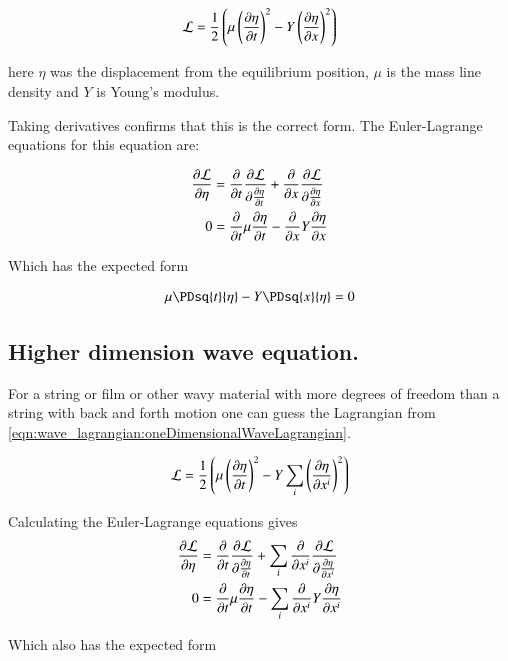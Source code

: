 \begin{align}\label{eqn:wave_lagrangian:oneDimensionalWaveLagrangian}
\mathcal{L} = \frac{1}{2} \left(\mu \left(\frac{\partial {\eta}}{\partial {t}}\right)^2 - Y \left(\frac{\partial {\eta}}{\partial {x}}\right)^2 \right)
\end{align}

here $\eta$ was the displacement from the equilibrium position, $\mu$ is the mass line density and $Y$ is Young's modulus.

Taking derivatives confirms that this is the correct form.  The Euler-Lagrange
equations for this equation are:

\begin{align*}
\frac{\partial {\mathcal{L}}}{\partial {\eta}} &= \frac{\partial {}}{\partial {t}} \frac{\partial {\mathcal{L}}}{\partial {\frac{\partial {\eta}}{\partial {t}}}} +\frac{\partial {}}{\partial {x}} \frac{\partial {\mathcal{L}}}{\partial {\frac{\partial {\eta}}{\partial {x}}}} \\
0 &= \frac{\partial {}}{\partial {t}} \mu \frac{\partial {\eta}}{\partial {t}} -\frac{\partial {}}{\partial {x}} Y \frac{\partial {\eta}}{\partial {x}} \\
\end{align*}

Which has the expected form

\begin{align*}
\mu \PDsq{t}{\eta} - Y \PDsq{x}{\eta} &= 0 \\
\end{align*}

\subsection{Higher dimension wave equation. }

For a string or film or other wavy material with more degrees of freedom than a string with back and forth motion one can guess the Lagrangian from \ref{eqn:wave_lagrangian:oneDimensionalWaveLagrangian}.

\begin{align}\label{eqn:wave_lagrangian:moreDimensionalWaveLagrangian}
\mathcal{L} = \frac{1}{2} \left(\mu \left(\frac{\partial {\eta}}{\partial {t}}\right)^2 - Y \sum_i \left(\frac{\partial {\eta}}{\partial {x^i}}\right)^2 \right)
\end{align}

Calculating the Euler-Lagrange equations gives
\begin{align*}
\frac{\partial {\mathcal{L}}}{\partial {\eta}} &= \frac{\partial {}}{\partial {t}} \frac{\partial {\mathcal{L}}}{\partial {\frac{\partial {\eta}}{\partial {t}}}} +\sum_i \frac{\partial {}}{\partial {x^i}} \frac{\partial {\mathcal{L}}}{\partial {\frac{\partial {\eta}}{\partial {x^i}}}} \\
0 &= \frac{\partial {}}{\partial {t}} \mu \frac{\partial {\eta}}{\partial {t}} - \sum_i \frac{\partial {}}{\partial {x^i}} Y \frac{\partial {\eta}}{\partial {x^i}} \\
\end{align*}

Which also has the expected form

